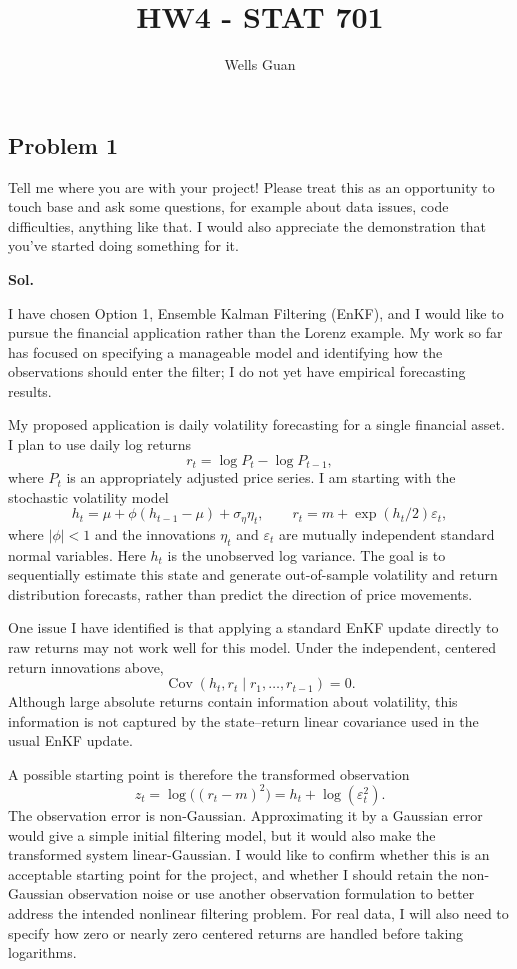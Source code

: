 \documentclass[lang=en,11pt,a4paper,citestyle =authoryear,nobib=true]{elegantpaper}
\title{HW4 - STAT 701}
\author{Wells Guan}
\begin{document}
\maketitle

\subsection*{Problem 1}
Tell me where you are with your project! Please treat this as an opportunity
to touch base and ask some questions, for example about data issues, code
difficulties, anything like that. I would also appreciate the demonstration
that you've started doing something for it.

\par\vspace{0.5em}\noindent\textbf{Sol.}\par
I have chosen Option 1, Ensemble Kalman Filtering (EnKF), and I
would like to pursue the financial application rather than the
Lorenz example. My work
so far has focused on specifying a manageable model and identifying
how the observations should enter the filter; I do not yet have
empirical forecasting results.

My proposed application is daily volatility forecasting for a
single financial asset. I plan to use daily log returns
\[
r_t=\log P_t-\log P_{t-1},
\]
where $P_t$ is an appropriately adjusted price series. I am starting
with the stochastic volatility model
\[
h_t=\mu+\phi(h_{t-1}-\mu)+\sigma_\eta\eta_t,
\qquad
r_t=m+\exp(h_t/2)\varepsilon_t,
\]
where $|\phi|<1$ and the innovations $\eta_t$ and $\varepsilon_t$
are mutually independent standard normal variables. Here $h_t$ is
the unobserved log variance. The goal is to sequentially estimate
this state and generate out-of-sample volatility and return
distribution forecasts, rather than predict the direction of
price movements.

One issue I have identified is that applying a standard EnKF update
directly to raw returns may not work well for this model. Under the
independent, centered return innovations above,
\[
\operatorname{Cov}(h_t,r_t\mid r_1,\ldots,r_{t-1})=0.
\]
Although large absolute returns contain information about volatility,
this information is not captured by the state--return linear
covariance used in the usual EnKF update.

A possible starting point is therefore the transformed observation
\[
z_t=\log\bigl((r_t-m)^2\bigr)
    =h_t+\log(\varepsilon_t^2).
\]
The observation error is non-Gaussian. Approximating it by a Gaussian
error would give a simple initial filtering model, but it would also
make the transformed system linear-Gaussian. I would like to confirm
whether this is an acceptable starting point for the project, and
whether I should retain the non-Gaussian observation noise or use
another observation formulation to better address the intended
nonlinear filtering problem. For real data, I will also need to
specify how zero or nearly zero centered returns are handled before
taking logarithms.
\end{document}
